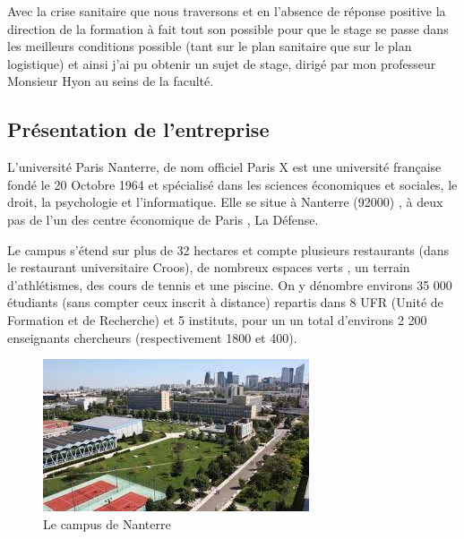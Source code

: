 \documentclass[a4paper, 12pt, twoside]{article}
\begin{document}
Avec la crise sanitaire que nous traversons et en l'absence de réponse positive la direction de la formation à fait tout son possible pour que le stage se passe dans les meilleurs conditions possible (tant sur le plan sanitaire que sur le plan logistique) et ainsi  j'ai pu obtenir un sujet de stage, dirigé par mon professeur \textsf{Monsieur Hyon} au seins de la faculté.
\subsection{Présentation de l'entreprise}
L'université Paris Nanterre, de nom officiel \textsf{Paris X} est une université française fondé le 20 Octobre 1964 et spécialisé dans les sciences économiques et sociales, le droit, la psychologie et l'informatique. Elle se situe à Nanterre (92000) , à deux pas de l'un des centre économique de Paris , La Défense.  \newline

Le campus s'étend sur plus de 32 hectares et compte plusieurs restaurants (dans le restaurant universitaire Croos), de nombreux espaces verts , un terrain d'athlétismes, des cours de tennis et une piscine.  On y dénombre environs 35 000 étudiants (sans compter ceux inscrit à distance) repartis dans 8 UFR (Unité de Formation et de Recherche) et 5 instituts, pour un un total d'environs 2 200 enseignants chercheurs (respectivement 1800 et 400).
\begin{center}
\begin{figure}[h]
\centering
\includegraphics[scale=1.3]{campus.jpeg}
\caption{Le campus de Nanterre}
\end{figure}
\end{center}
\end{document}
